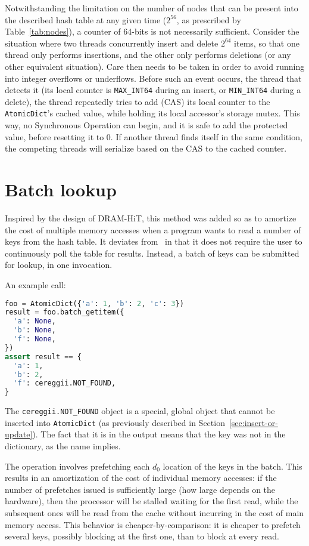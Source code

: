 Notwithstanding the limitation on the number of nodes that can be present into the described hash table at any given time ($2^{56}$, as prescribed by Table~\ref{tab:nodes}), a counter of 64-bits is not necessarily sufficient.
Consider the situation where two threads concurrently insert and delete $2^{64}$ items, so that one thread only performs insertions, and the other only performs deletions (or any other equivalent situation).
Care then needs to be taken in order to avoid running into integer overflows or underflows.
Before such an event occurs, the thread that detects it (its local counter is \texttt{MAX\_INT64} during an insert, or \texttt{MIN\_INT64} during a delete), the thread repeatedly tries to add (CAS) its local counter to the \texttt{AtomicDict}'s cached value, while holding its local accessor's storage mutex.
This way, no Synchronous Operation can begin, and it is safe to add the protected value, before resetting it to 0.
If another thread finds itself in the same condition, the competing threads will serialize based on the CAS to the cached counter.


\section{Batch lookup}\label{sec:batch-lookup}

Inspired by the design of DRAM-HiT, this method was added so as to amortize the cost of multiple memory accesses when a program wants to read a number of keys from the hash table.
It deviates from~\cite{dramhit} in that it does not require the user to continuously poll the table for results.
Instead, a batch of keys can be submitted for lookup, in one invocation.

An example call:

\begin{lstlisting}[language=Python,label={lst:batch-lookup-usage}]
foo = AtomicDict({'a': 1, 'b': 2, 'c': 3})
result = foo.batch_getitem({
  'a': None,
  'b': None,
  'f': None,
})
assert result == {
  'a': 1,
  'b': 2,
  'f': cereggii.NOT_FOUND,
}
\end{lstlisting}

The \texttt{cereggii.NOT\_FOUND} object is a special, global object that cannot be inserted into \texttt{AtomicDict} (as previously described in Section~\ref{sec:insert-or-update}).
The fact that it is in the output means that the key was not in the dictionary, as the name implies.

The operation involves prefetching each $d_0$ location of the keys in the batch.
This results in an amortization of the cost of individual memory accesses: if the number of prefetches issued is sufficiently large (how large depends on the hardware), then the processor will be stalled waiting for the first read, while the subsequent ones will be read from the cache without incurring in the cost of main memory access.
This behavior is cheaper-by-comparison: it is cheaper to prefetch several keys, possibly blocking at the first one, than to block at every read.

